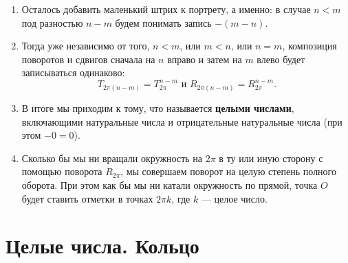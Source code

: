 \begin{enumerate}
\item Осталось добавить маленький штрих к портрету, а именно: в случае $n<m$ под разностью $n-m$ будем понимать запись $-(m-n)$.
\item Тогда уже независимо от того, $n<m$, или $m<n$, или $n=m$, композиция поворотов и сдвигов сначала на $n$ вправо и затем на $m$ влево будет записываться одинаково:
$$
T_{2\pi(n-m)}=T_{2\pi}^{n-m}\mbox{ и }R_{2\pi(n-m)}=R_{2\pi}^{n-m}.
$$
\item В итоге мы приходим к тому, что называется \textbf{целыми числами}, включающими натуральные числа и отрицательные натуральные числа (при этом $-0=0$).
\item Сколько бы мы ни вращали окружность на $2\pi$ в ту или иную сторону с помощью поворота $R_{2\pi}$, мы совершаем поворот на целую степень полного оборота. При этом как бы мы ни катали окружность по прямой, точка $O$ будет ставить отметки в точках $2\pi k$, где $k$ --- целое число.
\end{enumerate}

\section{Целые числа. Кольцо}


